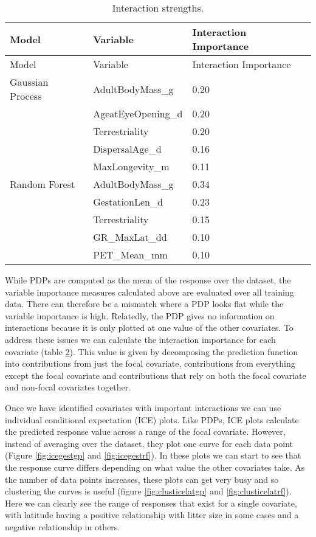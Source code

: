 \documentclass[10pt,]{article}
\begin{document}
\begin{table}[t!]
\begin{longtable}[c]{@{}lll@{}}
\caption{Interaction strengths. \label{tbl:interimp}}\tabularnewline
\toprule
Model & Variable & Interaction Importance\tabularnewline
\midrule
\endfirsthead
\toprule
Model & Variable & Interaction Importance\tabularnewline
\midrule
\endhead
Gaussian Process & AdultBodyMass\_g & 0.20\tabularnewline
& AgeatEyeOpening\_d & 0.20\tabularnewline
& Terrestriality & 0.20\tabularnewline
& DispersalAge\_d & 0.16\tabularnewline
& MaxLongevity\_m & 0.11\tabularnewline
Random Forest & AdultBodyMass\_g & 0.34\tabularnewline
& GestationLen\_d & 0.23\tabularnewline
& Terrestriality & 0.15\tabularnewline
& GR\_MaxLat\_dd & 0.10\tabularnewline
& PET\_Mean\_mm & 0.10\tabularnewline
\bottomrule
\end{longtable}
\end{table}



While PDPs are computed as the mean of the response over the dataset, the variable importance measures calculated above are evaluated over all training data. There can therefore be a mismatch where a PDP looks flat while the variable importance is high. Relatedly, the PDP gives no information on interactions because it is only plotted at one value of the other covariates. To address these issues we can calculate the interaction importance for each covariate (table \ref{tbl:interimp}). This value is given by decomposing the prediction function into contributions from just the focal covariate, contributions from everything except the focal covariate and contributions that rely on both the focal covariate and non-focal covariates together.


Once we have identified covariates with important interactions we can use individual conditional expectation (ICE) plots. Like PDPs, ICE plots calculate the predicted response value across a range of the focal covariate. However, instead of averaging over the dataset, they plot one curve for each data point (Figure \ref{fig:icegestgp} and \ref{fig:icegestrf}). In these plots we can start to see that the response curve differs depending on what value the other covariates take. As the number of data points increases, these plots can get very busy and so clustering the curves is useful (figure \ref{fig:clusticelatgp} and \ref{fig:clusticelatrf}). Here we can clearly see the range of responses that exist for a single covariate, with latitude having a positive relationship with litter size in some cases and a negative relationship in others.
\end{document}
